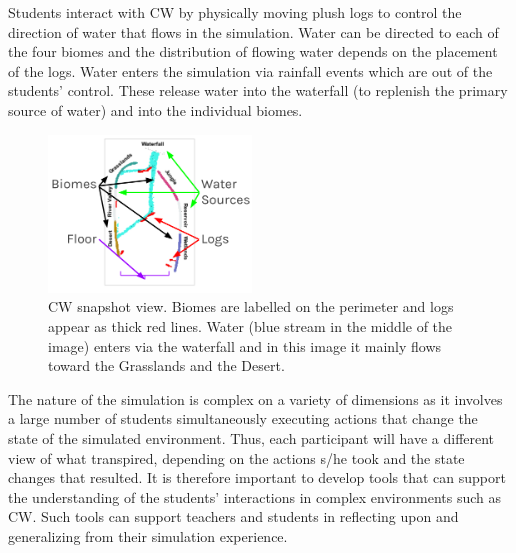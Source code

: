 \documentclass[letterpaper]{article} %
\newcommand{\kibitz}[2]{\ifnum\Comments=1{\textcolor{#1}{#2}}\fi}
\newcommand{\nh}[1]{\kibitz{blue}{[NH:#1]}}
\newcommand{\kg}[1]{\kibitz{red}{[KG:#1]}}
\begin{document}
Students interact with CW by physically moving plush logs to control the direction of water that flows in the simulation. Water can be directed to each of the four biomes and the distribution of flowing water depends on the placement of the logs. Water enters the simulation via rainfall events which are out of the students' control. These release water into the waterfall (to replenish the primary source of water) and into the individual biomes.

\begin{figure}[t]
\centering
\includegraphics[width=0.48\textwidth]{./images/cw_snapshot.png}
\caption{CW snapshot view. Biomes are labelled on the perimeter and logs appear as thick red lines. Water (blue stream in the middle of the image) enters via the waterfall and in this image it mainly flows toward the Grasslands and the Desert.}
\label{fig:connected_worlds_graphic}
\end{figure}

The nature of the simulation is complex on a variety of dimensions as it involves a large number of students simultaneously executing actions that change the state of the simulated environment. Thus, each participant will have a different view of what transpired, depending on the actions s/he took and the state changes that resulted.
It is therefore important to develop tools that can support  the understanding of the students' interactions in complex environments such as CW.
Such tools can  support teachers and students in reflecting upon and generalizing from their simulation experience.
\end{document}
